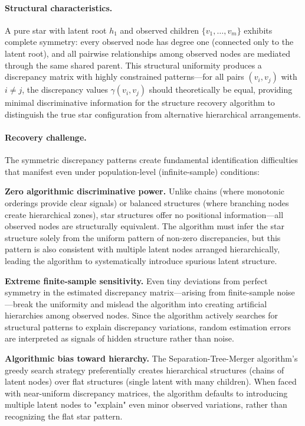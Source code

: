 \documentclass[11pt,a4paper]{article}
\numberwithin{equation}{section}
\begin{document}
\paragraph{Structural characteristics.} A pure star with latent root $h_1$ and observed children $\{v_1, \ldots, v_m\}$ exhibits complete symmetry: every observed node has degree one (connected only to the latent root), and all pairwise relationships among observed nodes are mediated through the same shared parent. This structural uniformity produces a discrepancy matrix with highly constrained patterns—for all pairs $(v_i, v_j)$ with $i \neq j$, the discrepancy values $\gamma(v_i, v_j)$ should theoretically be equal, providing minimal discriminative information for the structure recovery algorithm to distinguish the true star configuration from alternative hierarchical arrangements.

\paragraph{Recovery challenge.} The symmetric discrepancy patterns create fundamental identification difficulties that manifest even under population-level (infinite-sample) conditions:

\textbf{Zero algorithmic discriminative power.} Unlike chains (where monotonic orderings provide clear signals) or balanced structures (where branching nodes create hierarchical zones), star structures offer no positional information—all observed nodes are structurally equivalent. The algorithm must infer the star structure solely from the uniform pattern of non-zero discrepancies, but this pattern is also consistent with multiple latent nodes arranged hierarchically, leading the algorithm to systematically introduce spurious latent structure.

\textbf{Extreme finite-sample sensitivity.} Even tiny deviations from perfect symmetry in the estimated discrepancy matrix—arising from finite-sample noise—break the uniformity and mislead the algorithm into creating artificial hierarchies among observed nodes. Since the algorithm actively searches for structural patterns to explain discrepancy variations, random estimation errors are interpreted as signals of hidden structure rather than noise.

\textbf{Algorithmic bias toward hierarchy.} The Separation-Tree-Merger algorithm's greedy search strategy preferentially creates hierarchical structures (chains of latent nodes) over flat structures (single latent with many children). When faced with near-uniform discrepancy matrices, the algorithm defaults to introducing multiple latent nodes to "explain" even minor observed variations, rather than recognizing the flat star pattern.
\end{document}

